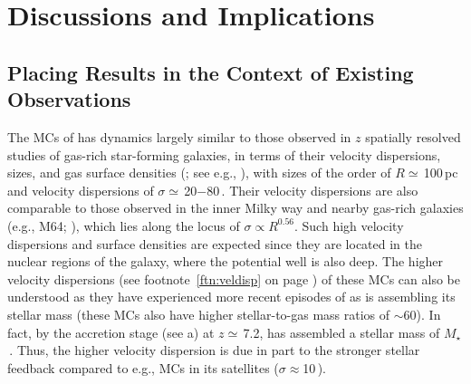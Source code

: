 \IfFileExists{emulateapjlegacy.cls}{\documentclass[iop]{emulateapjlegacy}}{\documentclass[iop]{emulateapj}}
\def\figpath{./Fig}
\begin{document}
%

\section{Discussions and Implications}\label{sec:diss}

\subsection{Placing Results in the Context of Existing Observations} \label{sec:diss1}

The MCs of \flower has dynamics largely similar to those observed in $z$ spatially resolved studies of gas-rich star-forming galaxies, in terms of their velocity dispersions, sizes, and gas surface densities (; see e.g., \citealt{Swinbank11a}), with sizes of the order of $R\simeq$\,100\,pc and velocity dispersions of $\sigma\simeq$\,20$-$80\,\kms.
%
%
Their velocity dispersions are also comparable to those observed in the inner Milky way and nearby gas-rich galaxies (e.g., M64; \citealt{Oka01a, Rosolowsky05a, Heyer09a}), which lies along the locus of $\sigma\propto R^{0.56}$. Such high velocity dispersions and surface densities are expected since they are located in the nuclear regions of the galaxy, where the potential well is also deep. The higher velocity dispersions
(see footnote~\ref{ftn:veldisp} on page \pageref{ftn:veldisp}) of these MCs can also be understood as they have experienced more recent episodes of \SF as \flower is assembling its stellar mass (these MCs also have higher stellar-to-gas mass ratios of $\sim$60).
%
In fact, by the accretion stage (see a) at $z\simeq$\,7.2, 
\flower has assembled a stellar mass of $M_\star$\,\Msun. Thus, the higher velocity dispersion is due in part to the stronger stellar feedback compared to e.g., MCs in its satellites ($\sigma\approx$10\,\kms).
\end{document}
